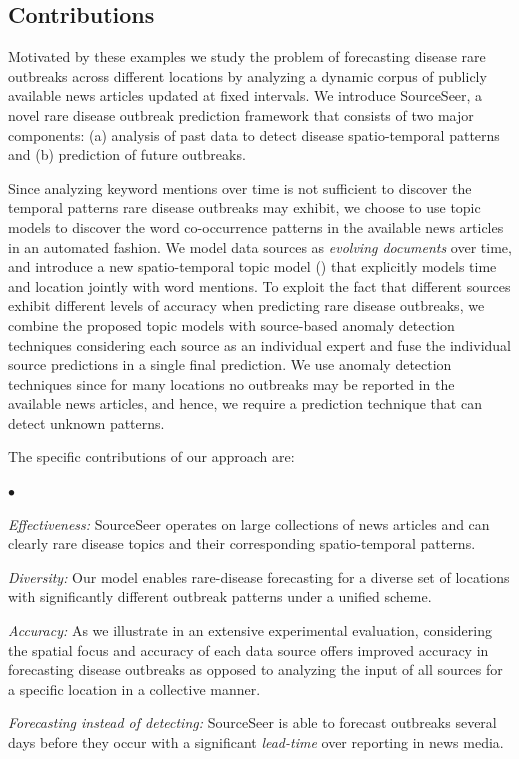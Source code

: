 \documentclass[twoside,leqno,twocolumn]{article}
\newcommand{\squishlist}{
   \begin{list}{$\bullet$}
    {
      \setlength{\itemsep}{0pt}
      \setlength{\parsep}{3pt}
      \setlength{\topsep}{3pt}
      \setlength{\partopsep}{0pt}
      \setlength{\leftmargin}{1.5em}
      \setlength{\labelwidth}{1em}
      \setlength{\labelsep}{0.5em} } }
\newcommand{\squishend}{
    \end{list}  }
\newcommand{\fullmodel}{{{\sf SourceSeer}}\xspace}
\begin{document}
\vspace{-10pt}
\subsection{Contributions}
\label{sec:contr}

Motivated by these examples we study the problem of forecasting disease rare outbreaks across different locations by analyzing a dynamic corpus of publicly available news articles updated at fixed intervals. We introduce \fullmodel, a novel rare disease outbreak prediction framework that consists of two major components: (a) analysis of past data to detect disease spatio-temporal patterns and (b) prediction of future outbreaks. 

Since analyzing keyword mentions over time is not sufficient to discover the temporal patterns rare disease outbreaks may exhibit, we choose to use topic models to discover the word co-occurrence patterns in the available news articles in an automated fashion. We model data sources as {\em evolving documents} over time, and introduce a new spatio-temporal topic model () that explicitly models time and location jointly with word mentions. To exploit the fact that different sources exhibit different levels of accuracy when predicting rare disease outbreaks, we combine the proposed topic models with source-based anomaly detection techniques considering each source as an individual expert and fuse the individual source predictions in a single final prediction. We use anomaly detection techniques since for many locations no outbreaks may be reported in the available news articles, and hence, we require a prediction technique that can detect  unknown patterns.

The specific contributions of our approach are:
\squishlist
\item {\em Effectiveness:} \fullmodel operates on large collections of news articles and can clearly rare disease topics and their corresponding spatio-temporal patterns.
\item {\em Diversity:} Our model enables rare-disease forecasting for a diverse set of locations with significantly different outbreak patterns under a unified scheme. 
\item {\em Accuracy:} As we illustrate in an extensive experimental evaluation, considering the spatial focus and accuracy of each data source offers improved accuracy in forecasting disease outbreaks as opposed to analyzing the input of all sources for a specific location in a collective manner. 
\item{\em Forecasting instead of detecting:} \fullmodel is able to forecast outbreaks several days before they occur with a significant {\em lead-time} over reporting in news media. 
\squishend
\end{document}
